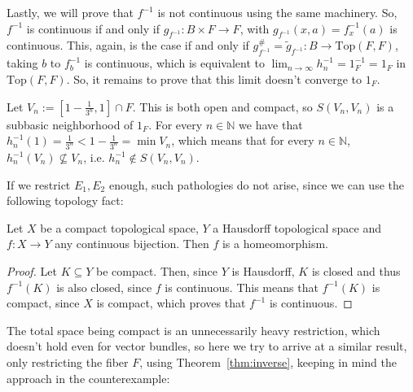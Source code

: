 \begin{example}
Lastly, we will prove that $f^{-1}$ is not continuous using the same machinery. So, $f^{-1}$ is continuous if and only if $g_{f^{-1}}:B\times F\to F$, with $g_{f^{-1}}(x,a)=f^{-1}_x(a)$ is continuous. This, again, is the case if and only if $g_{f^{-1}}^{\#}=\tilde{g}_{f^{-1}}:B\to\mathrm{Top}(F,F)$, taking $b$ to $f_b^{-1}$ is continuous, which is equivalent to $\lim_{n\to\infty}h_n^{-1}=1_F^{-1}=1_F$ in $\mathrm{Top}(F,F)$. So, it remains to prove that this limit doesn't converge to $1_F$.

Let $V_n:=[1-\frac{1}{3^n},1]\cap F$. This is both open and compact, so $S(V_n,V_n)$ is a subbasic neighborhood of $1_F$. For every $n\in\mathbb{N}$ we have that $h_n^{-1}(1)=\frac{1}{3^n}<1-\frac{1}{3^n}=\min V_n$, which means that for every $n\in\mathbb{N}$, $h_n^{-1}(V_n)\not\subseteq V_n$, i.e. $h^{-1}_n\not\in S(V_n,V_n)$.
\end{example}

If we restrict $E_1,E_2$ enough, such pathologies do not arise, since we can use the following topology fact:
\begin{proposition}\label{prop:extend_fb} Let $X$ be a compact topological space, $Y$ a Hausdorff topological space and $f:X\to Y$ any continuous bijection. Then $f$ is a homeomorphism.
\end{proposition}
\begin{proof} Let $K\subseteq Y$ be compact. Then, since $Y$ is Hausdorff, $K$ is closed and thus $f^{-1}(K)$ is also closed, since $f$ is continuous. This means that $f^{-1}(K)$ is compact, since $X$ is compact, which proves that $f^{-1}$ is continuous.
\end{proof}

The total space being compact is an unnecessarily heavy restriction, which doesn't hold even for vector bundles, so here we try to arrive at a similar result, only restricting the fiber $F$, using Theorem~\ref{thm:inverse}, keeping in mind the approach in the counterexample:

